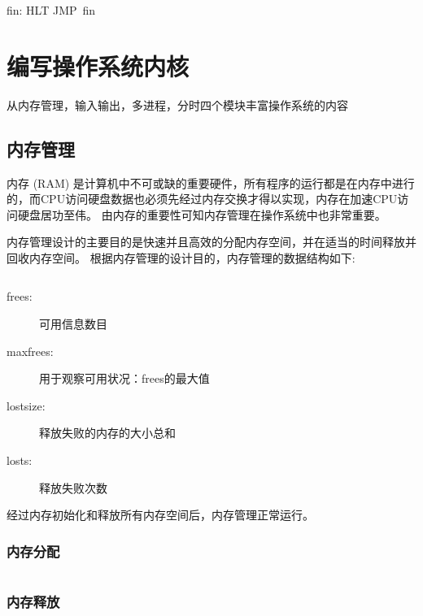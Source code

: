 \documentclass{swfcthesis}
\begin{document}
	\begin{listing}[H]
		fin:
			HLT
			JMP fin
	\end{listing}
		
\chapter{编写操作系统内核}

	从内存管理，输入输出，多进程，分时四个模块丰富操作系统的内容

	\section{内存管理}

		内存 (RAM) 是计算机中不可或缺的重要硬件，所有程序的运行都是在内存中进行的，而CPU访问硬盘数据也必须先经过内存交换才得以实现，内存在加速CPU访问硬盘居功至伟。
		由内存的重要性可知内存管理在操作系统中也非常重要。	
		
		内存管理设计的主要目的是快速并且高效的分配内存空间，并在适当的时间释放并回收内存空间。
		根据内存管理的设计目的，内存管理的数据结构如下:

		\inputminted[tabsize=2, firstline=137, lastline=143,
		linenos=true]{c}{../ZOS/src/kernel/bootpack.h}
		
		\begin{description}
			\item[frees:]可用信息数目
			\item[maxfrees:]用于观察可用状况：frees的最大值
			\item[lostsize:]释放失败的内存的大小总和
			\item[losts:]释放失败次数
		\end{description}
		
		经过内存初始化和释放所有内存空间后，内存管理正常运行。
		
		\subsection{内存分配}

		\begin{listing}[H]
			\inputminted[tabsize=2, firstline=68, lastline=80,
			linenos=true]{c}{../ZOS/src/kernel/memory.c}
		\end{listing}
		
		\subsection{内存释放}
\end{document}
